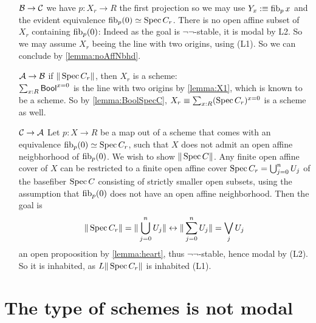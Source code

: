 \begin{enumerate}
	\item [$\mathcal{B} \rightarrow \mathcal{C}$]
	we have $p : X_r \to R$ the first projection so we may use $Y_x :\equiv \operatorname{fib}_p x$ and the evident equivalence $\operatorname{fib}_p(0) \simeq \operatorname{Spec} C_r$.
	There is no open affine subset of $X_r$ containing $\operatorname{fib}_p(0)$: Indeed as the goal is $\lnot \lnot$-stable, it is modal by L2. So we may assume $X_r$ beeing the line with two origins, using (L1). So we can conclude by \ref{lemma:noAffNbhd}.
	\item [$\mathcal{A} \rightarrow \mathcal{B}$]
	if $\|\operatorname{Spec} C_r\|$, then $X_r$ is a scheme: \\
	$\sum_{x : R} \mathsf{Bool}^{x = 0}$ is the line with two origins by \ref{lemma:X1}, which is known to be a scheme. So by \ref{lemma:BoolSpecC}, $X_r \equiv \sum_{x : R} (\operatorname{Spec} C_r)^{x=0}$ is a scheme as well. 
	\item [$\mathcal{C} \rightarrow \mathcal{A}$]
	Let $p : X \to R$ be a map out of a scheme that comes with an equivalence $\operatorname{fib}_p(0) \simeq \operatorname{Spec} C_r$, such that $X$ does not admit an open affine neigbhorhood of $\operatorname{fib}_p(0)$. We wish to show $\|\operatorname{Spec} C\|$. Any finite open affine cover of $X$ can be restricted to a finite open affine cover $\operatorname{Spec} C_r= \bigcup_{j=0}^{n} U_j$ of the basefiber $\operatorname{Spec} C$ consisting of strictly smaller open subsets, using the assumption that $\operatorname{fib}_p(0)$ does not have an open affine neighborhood. 
	Then the goal is
	\[
	\| \operatorname{Spec} C_r\| = \| \bigcup_{j=0}^{n} U_j \| \leftrightarrow \| \sum_{j=0}^n U_j\| = \bigvee_j  U_j
	\]
	an open propoosition by \ref{lemma:heart}, thus $\lnot \lnot$-stable, hence modal by (L2). So it is inhabited, as $L \|\operatorname{Spec} C_r\|$ is inhabited (L1).
\end{enumerate}
\ifsc
\section{The type of schemes is not modal}
\else
